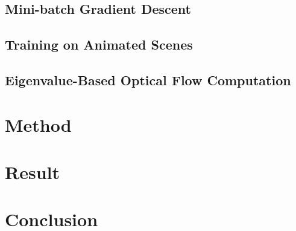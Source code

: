 \documentclass[]{article}
\begin{document}
\subsection{Mini-batch Gradient Descent}
\subsection{Training on Animated Scenes}
\subsection{Eigenvalue-Based Optical Flow Computation}

\section{Method}

\section{Result}

\section{Conclusion}

\pagebreak
\listoftables
\listoffigures
\printbibliography[heading=bibintoc]{}
\end{document}

